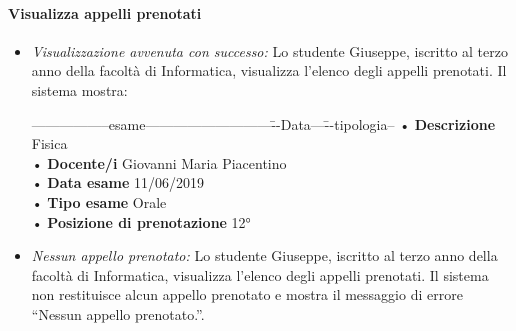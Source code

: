 \paragraph{Visualizza appelli prenotati}
\begin{itemize}
	\item \textit{Visualizzazione avvenuta con successo:}
	Lo studente Giuseppe, iscritto al terzo anno della facoltà di Informatica, visualizza l'elenco degli appelli prenotati. Il sistema mostra: 
	\begin{tabbing}
		\hspace{1cm}-----------------esame---------------------------\=--Data---\= --tipologia--\kill
		\hspace{1cm} • \textbf{Descrizione} Fisica \\ 
		\hspace{1cm} • \textbf{Docente/i} Giovanni Maria Piacentino \\
		\hspace{1cm} • \textbf{Data esame} 11/06/2019 \\
		\hspace{1cm} • \textbf{Tipo esame} Orale \\
		\hspace{1cm} • \textbf{Posizione di prenotazione} 12° \\
	\end{tabbing}
	
	\item \textit{Nessun appello prenotato:}
	Lo studente Giuseppe, iscritto al terzo anno della facoltà di Informatica, visualizza l'elenco degli appelli prenotati. Il sistema non restituisce alcun appello prenotato e mostra il messaggio di errore “Nessun appello prenotato.”. 
\end{itemize}


